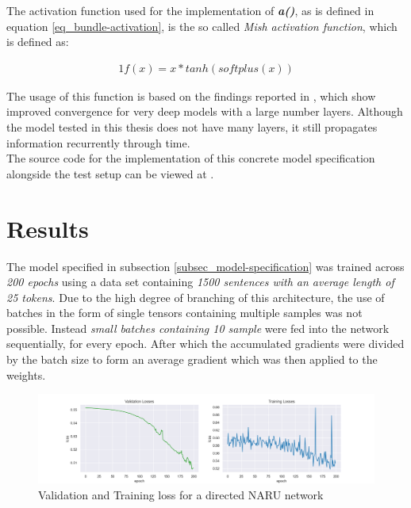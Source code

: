 The activation function used for the implementation of \textit{\textbf{a()}}, as is defined
in equation \ref{eq_bundle-activation}, is the so called \textit{Mish activation function}, which is defined as:

\begin{alignat}{1}\label{eq_mish}
 f(x) = x * tanh(softplus(x)) 
\end{alignat}

The usage of this function is based on the findings reported in  \cite{32_mish-misra2020}, which show improved convergence for very deep models with a large number layers. Although the model tested in this thesis does not have many layers, it still propagates information recurrently through time. \\

The source code for the implementation of this concrete model specification alongside the test setup can be viewed at \cite{naru-github}.
 
 \clearpage
 
\section{Results}

The model specified in subsection \ref{subsec_model-specification}
was trained across \textit{200 epochs}
using a data set containing \textit{1500 sentences
with an average length of 25 tokens}.
Due to the high degree of branching
of this architecture, the use of batches
in the form of single tensors containing multiple
samples was not possible.
Instead \textit{small batches containing 10 sample}
were fed into the network sequentially, for every epoch. After which the accumulated gradients were divided by the batch size to form an average gradient which was then applied to the
weights. 


\begin{figure}[h]
    \includegraphics[width=\textwidth]{PICs/Results/validation-and-training-loss.png}
    
    \caption{Validation and Training loss for a directed NARU network}
    \label{results-validation-and-training}
\end{figure}

